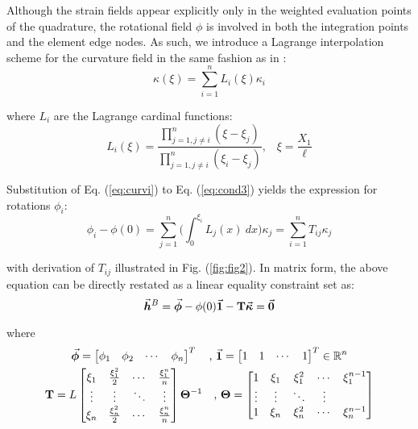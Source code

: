 Although the strain fields appear explicitly
only in the weighted evaluation points of the quadrature, the rotational field
$\phi$ is involved in both the integration points and the element edge nodes.
As such, we introduce a Lagrange interpolation scheme for the curvature
field in the same fashion as in \cite{Andriotis}:
\begin{equation}
	\kappa(\xi) = \sum_{i=1}^nL_i(\xi)\kappa_i
	\label{eq:curvi}
\end{equation}

\noindent where $L_i$ are the Lagrange cardinal functions:
\begin{equation}
	L_i(\xi) = \frac{\displaystyle\prod_{j=1,j\neq i}^n
		(\xi-\xi_j)}{\displaystyle\prod_{j=1,j\neq i}^n 
		(\xi_i-\xi_j)}\text{,}\quad
	\xi=\frac{X_1}{\ell}\nonumber
\end{equation}

\noindent Substitution of Eq. (\ref{eq:curvi}) to Eq. (\ref{eq:cond3}) yields
the expression for rotations $\phi_i$:
\begin{equation}
	\phi_i-\phi(0) = \sum_{j=1}^n\bigg(\int_0^{\xi_i}L_j(x)\ dx\bigg)\kappa_j =
	\sum_{i=1}^n T_{ij}\kappa_j
\end{equation}
\begin{figure*}[b]
	\centering
	\qquad
	\caption{Integration of curvature shape functions.}%
	\label{fig:fig2}%
\end{figure*}
\noindent with derivation of $T_{ij}$ illustrated in Fig.  (\ref{fig:fig2}).
In matrix form, the above equation can be directly restated as a linear
equality constraint set as:
\begin{equation}
	\vec{\boldsymbol{h}}^B=\vec{\boldsymbol{\phi}} - \phi(0)\vec{\boldsymbol{1}} - \mathbf{T}\vec{\boldsymbol{\kappa}} = \vec{\boldsymbol{0}}
	\label{eq:hb}
\end{equation}

\noindent where
\begin{gather}
	\vec{\boldsymbol{\phi}}=
	\begin{bmatrix}
		\phi_1 & \phi_2 & \cdots & \phi_n
	\end{bmatrix}^T\quad \text{,}\ \vec{\boldsymbol{1}}= \begin{bmatrix}
		1 & 1 & \cdots & 1
	\end{bmatrix}^T\in\mathbb{R}^n \nonumber\\
	\mathbf{T} = L\begin{bmatrix}
		\xi_1 & \frac{\xi_1^2}{2} & \cdots & \frac{\xi_1^n}{n}\\
		\vdots & \vdots & \ddots & \vdots\\
		\xi_n & \frac{\xi_n^2}{2} & \cdots & \frac{\xi_n^n}{n}
	\end{bmatrix}\mathbf{\Theta}^{-1}\quad \text{,}\ \mathbf{\Theta} = 
	\begin{bmatrix}
		1 & \xi_1 & \xi_1^2 & \cdots & \xi_1^{n-1}\\
		\vdots &\vdots & \ddots & \vdots\\
		1 & \xi_n & \xi_n^2 & \cdots &\xi_n^{n-1}
	\end{bmatrix}\nonumber
\end{gather}

